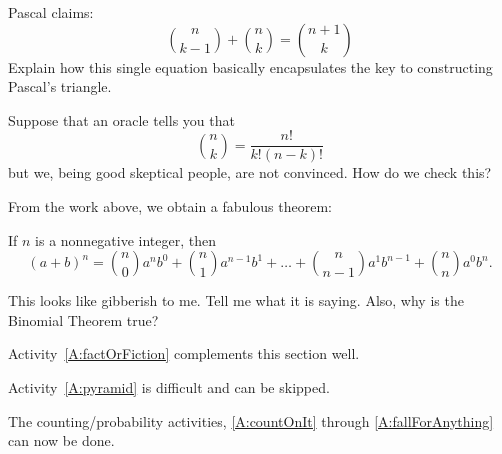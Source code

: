 \begin{question}
Pascal claims:
\[
\binom{n}{k-1} +  \binom{n}{k} = \binom{n+1}{k}
\]
Explain how this single equation basically encapsulates the key
to constructing Pascal's triangle.
\end{question}
\QM

\begin{question}
Suppose that an oracle tells you that
\[
\binom{n}{k} = \frac{n!}{k!(n-k)!}
\]
but we, being good skeptical people, are not convinced. How do we
check this?
\end{question}
\QM

From the work above, we obtain a fabulous theorem:


\begin{theorem} 
If $n$ is a nonnegative integer, then
\[
(a+b)^n = \binom{n}{0} a^nb^0 + \binom{n}{1} a^{n-1}b^1 + \dots + \binom{n}{n-1} a^{1}b^{n-1} + \binom{n}{n} a^{0}b^n.   
\]
\end{theorem}


\begin{question} 
This looks like gibberish to me. Tell me what it is saying. Also, why
is the Binomial Theorem true?
\end{question}
\QM

\begin{teachingnote}
Activity~\ref{A:factOrFiction} complements this section well. 
\end{teachingnote}



\begin{teachingnote}
Activity~\ref{A:pyramid} is difficult and can be skipped.
\end{teachingnote}


\begin{teachingnote}
The counting/probability activities, \ref{A:countOnIt} through \ref{A:fallForAnything} can now be done.
\end{teachingnote}



